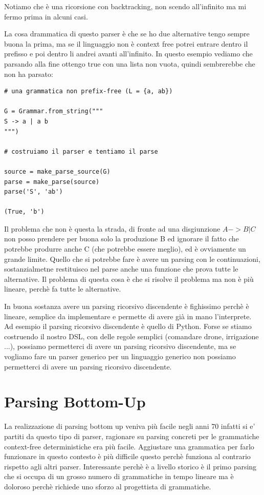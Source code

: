 Notiamo che è una ricorsione con backtracking, non scendo all'infinito ma mi fermo prima in alcuni casi.

La cosa drammatica di questo parser è che se ho due alternative tengo sempre buona la prima, ma se il linguaggio non è context free potrei entrare dentro il prefisso e poi dentro li andrei avanti all'infinito. In questo esempio vediamo che parsando alla fine ottengo true con una lista non vuota, quindi sembrerebbe che non ha parsato:
\begin{lstlisting}
# una grammatica non prefix-free (L = {a, ab})

G = Grammar.from_string("""
S -> a | a b
""")

# costruiamo il parser e tentiamo il parse

source = make_parse_source(G)
parse = make_parse(source)
parse('S', 'ab')

(True, 'b') 
\end{lstlisting}

Il problema che non è questa la strada, di fronte ad una disgiunzione $A -> B | C$ non posso prendere per buona solo la produzione B ed ignorare il fatto che potrebbe produrre anche C (che potrebbe essere meglio), ed è ovviamente un grande limite. Quello che si potrebbe fare è avere un parsing con le continuazioni, sostanzialmetne restituisco nel parse anche una funzione che prova tutte le alternative. Il problema di questa cosa è che si risolve il problema ma non è più lineare, perchè fa tutte le alternative.

In buona sostanza avere un parsing ricorsivo discendente è fighissimo perchè è lineare, semplice da implementare e permette di avere già in mano l'interprete. Ad esempio il parsing ricorsivo discendente è quello di Python.
Forse se stiamo costruendo il nostro DSL, con delle regole semplici (comandare drone, irrigazione ...), possiamo permetterci di avere un parsing ricorsivo discendente, ma se vogliamo fare un parser generico per un linguaggio generico non possiamo permetterci di avere un parsing ricorsivo discendente.

\section{Parsing Bottom-Up}
La realizzazione di parsing bottom up veniva più facile negli anni 70 infatti si e' partiti da questo tipo di parser, ragionare su parsing concreti per le grammatiche context-free deterministiche era più facile. Aggiustare una grammatica per farlo funzionare in questo contesto è più difficile questo perchè funziona al contrario rispetto agli altri parser.
Interessante perchè è a livello storico è il primo parsing che si occupa di un grosso numero di grammatiche in tempo lineare ma è doloroso perchè richiede uno sforzo al progettista di grammatiche.

